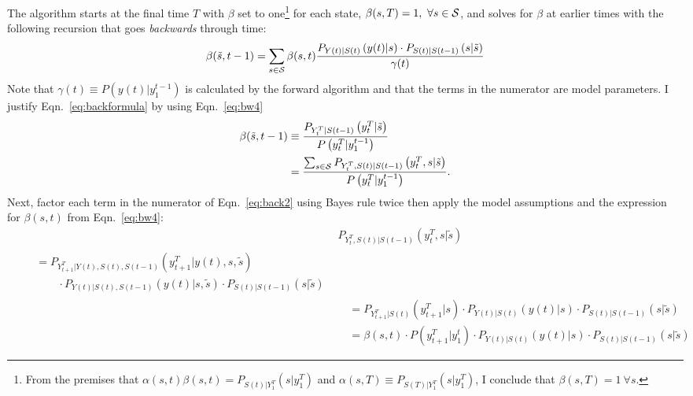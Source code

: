 \documentclass[]{article}
\newcommand{\ts}[3]{#1_{#2}^{#3}}                    %
\newcommand{\ti}[2]{{#1}{(#2)}}                  %
\newcommand{\states}{{\cal S}}
\begin{document}
The algorithm starts at the final time $T$ with $\beta$ set to
one\footnote{From the premises that $\alpha(s,t) \beta(s,t) =
  P_{\ti{S}{t}|\ts{Y}{1}{T}} \left(s|\ts{y}{1}{T} \right)$ and
  $\alpha(s,T) \equiv P_{S(T)|\ts{Y}{1}{T}}\left(s |\ts{y}{1}{T}
  \right)$, I conclude that $\beta(s,T) = 1 ~\forall s$.} %
for each state, $\beta(s,T) = 1,~\forall s \in \states$, and solves
for $\beta$ at earlier times with the following recursion that goes
\emph{backwards} through time:
\begin{equation}
  \label{eq:backformula}
  \beta({\tilde s},t-1) = \sum_{s\in\states} \beta(s,t)
  \frac{ P_{\ti{Y}{t}|\ti{S}{t}}
    \left(\ti{y}{t}|s \right) \cdot P_{\ti{S}{t}|\ti{S}{t-1}}
    \left(s|{\tilde s} \right)} {\ti{\gamma}{t}}
\end{equation}
Note that ${\ti{\gamma}{t} \equiv P \left( \ti{y}{t} |
    \ts{y}{1}{t-1}\right)}$ is calculated by the forward algorithm and
that the terms in the numerator are model parameters.  I justify
Eqn.~\eqref{eq:backformula} by using Eqn.~\eqref{eq:bw4}
\begin{align}
  \beta({\tilde s},t-1) & \equiv \frac{P_{\ts{Y}{t}{T}|\ti{S}{t-1}}
    \left(\ts{y}{t}{T}|{\tilde s} \right)}
  {P \left(\ts{y}{t}{T}|\ts{y}{1}{t-1} \right)} \\
  \label{eq:back2}
  &= \frac{\sum_{s\in\states} P_{\ts{Y}{t}{T},\ti{S}{t}|\ti{S}{t-1}}
    \left(\ts{y}{t}{T},s|{\tilde s} \right)} {P
    \left(\ts{y}{t}{T}|\ts{y}{1}{t-1} \right)}.
\end{align}
Next, factor each term in the numerator of Eqn.~\eqref{eq:back2} using
Bayes rule twice then apply the model assumptions and the expression
for $\beta(s,t)$ from Eqn.~\eqref{eq:bw4}:
\begin{align*}
  & P_{\ts{Y}{t}{T},\ti{S}{t}|\ti{S}{t-1}}\left( \ts{y}{t}{T},s|{\tilde s} \right)\\
  \begin{split}
    &\quad= P_{\ts{Y}{t+1}{T}|\ti{Y}{t},\ti{S}{t},\ti{S}{t-1}}
       \left(\ts{y}{t+1}{T}|\ti{y}{t},s,{\tilde s} \right)\\
    &\quad\qquad \cdot P_{\ti{Y}{t}|\ti{S}{t},\ti{S}{t-1}} \left(\ti{y}{t}|s,{\tilde s}
       \right)\cdot P_{\ti{S}{t}|\ti{S}{t-1}} \left(s|{\tilde s} \right)
  \end{split}\\
  &\quad= P_{\ts{Y}{t+1}{T}|\ti{S}{t}} \left(\ts{y}{t+1}{T}|s\right)
           \cdot P_{\ti{Y}{t}|\ti{S}{t}} \left(\ti{y}{t}|s \right) \cdot
            P_{\ti{S}{t}|\ti{S}{t-1}} \left(s|{\tilde s} \right) \\
  &\quad= \beta(s,t) \cdot P \left(\ts{y}{t+1}{T}|\ts{y}{1}{t} \right)
           \cdot P_{\ti{Y}{t}|\ti{S}{t}} \left(\ti{y}{t}|s \right) \cdot
            P_{\ti{S}{t}|\ti{S}{t-1}} \left(s|{\tilde s} \right)
\end{align*}
\end{document}
